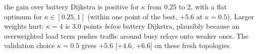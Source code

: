 the gain over battery Dijkstra is positive for $\kappa$ from 0.25 to 2, with a flat optimum for $\kappa\in[0.25, 1]$ (within one point of the best, +5.6 at $\kappa=0.5$). Larger weights hurt: $\kappa=4$ is 3.0 points \emph{below} battery Dijkstra, plausibly because an overweighted load term pushes traffic around busy relays onto weaker ones. The validation choice $\kappa=0.5$ gives $+5.6$ [$+4.6$, $+6.6$] on these fresh topologies.
